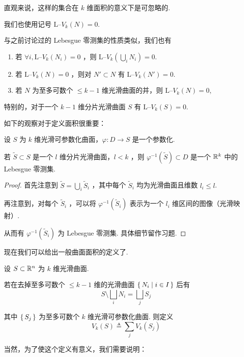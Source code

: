直观来说，这样的集合在 $k$ 维面积的意义下是可忽略的.

我们也使用记号 $\text{L--}V_k(N)=0$.

与之前讨论过的 Lebesgue 零测集的性质类似，我们也有

\begin{property}
    \begin{enumerate}
        \item 若 $\forall i,\text{L--}V_k(N_i)=0$ ，则 $\displaystyle\text{L--}V_k\left(\bigcup_iN_i\right)=0$.
        
        \item 若 $\text{L--}V_k(N)=0$ ，则对 $N'\subset N$ 有 $\text{L--}V_k(N')=0$.
        
        \item 若 $N$ 为至多可数个 $\le k-1$ 维光滑曲面的并，则 $\text{L--}V_k(N)=0$,
    \end{enumerate}
\end{property}

特别的，对于一个 $k-1$ 维分片光滑曲面 $S$ 有 $\text{L--}V_k(S)=0$.


如下的观察对于定义面积很重要：

\begin{lemma}
    设 $S$ 为 $k$ 维光滑可参数化曲面，$\varphi:D\to S$ 是一个参数化.

    若 $\widetilde{S}\subset S$ 是一个 $l$ 维分片光滑曲面，$l<k$ ，则 $\varphi^{-1}(\widetilde{S})\subset D$ 是一个 $\mathbb{R}^k$ 中的 Lebesgue 零测集.
\end{lemma}
\begin{proof}
    首先注意到 $\widetilde{S}=\bigcup_i\widetilde{S}_i$ ，其中每个 $\widetilde{S}_i$ 均为光滑曲面且维数 $l_i\le l$.

    再注意到，对每个 $\widetilde{S}_i$ ，可以将 $\varphi^{-1}(\widetilde{S}_i)$ 表示为一个 $l_i$ 维区间的图像（光滑映射）.

    从而有 $\varphi^{-1}(\widetilde{S}_i)$ 为 Lebesgue 零测集. 具体细节留作习题.
\end{proof}


现在我们可以给出一般曲面面积的定义了.

\begin{definition}
    设 $S\subset\mathbb{R}^n$ 为 $k$ 维光滑曲面.

    若在去掉至多可数个 $\le k-1$ 维的光滑曲面 $\set{N_i|i\in I}$ 后有
    $$
    S\setminus\bigsqcup_iN_i=\bigsqcup_jS_j
    $$

    其中 $\set{S_j}$ 为至多可数个 $k$ 维光滑可参数化曲面. 则定义
    $$
    V_k(S)\triangleq\sum_jV_k(S_j)
    $$
\end{definition}
\begin{hint}
    当然，为了使这个定义有意义，我们需要说明：
\end{hint}

